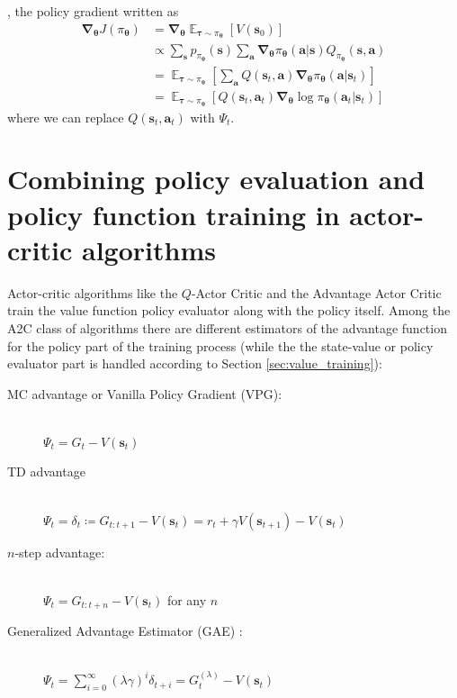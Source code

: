 \documentclass{article}
\begin{document}
\cite{sutton_barto_rl}, the policy gradient written as\begin{equation}\begin{split}\boldsymbol{\nabla}_{\boldsymbol{\theta}}J(\pi_{\boldsymbol{\theta}})&=\boldsymbol{\nabla}_{\boldsymbol{\theta}}\mathop{\mathbb{E}}_{\boldsymbol{\tau}\sim\pi_{\boldsymbol{\theta}}}[V(\mathbf{s}_0)]\\&\propto\sum_\mathbf{s}p_{\pi_{\boldsymbol{\theta}}}(\mathbf{s})\sum_\mathbf{a}\boldsymbol{\nabla}_{\boldsymbol{\theta}}\pi_{\boldsymbol{\theta}}(\mathbf{a}|\mathbf{s})Q_{\pi_{\boldsymbol{\theta}}}(\mathbf{s},\mathbf{a})\\&=\mathop{\mathbb{E}}_{\boldsymbol{\tau}\sim\pi_{\boldsymbol{\theta}}}\left[\sum_\mathbf{a}Q(\mathbf{s}_t, \mathbf{a})\boldsymbol{\nabla}_{\boldsymbol{\theta}}\pi_{\boldsymbol{\theta}}(\mathbf{a}|\mathbf{s}_t)\right]\\&=\mathop{\mathbb{E}}_{\boldsymbol{\tau}\sim\pi_{\boldsymbol{\theta}}}\left[Q(\mathbf{s}_t, \mathbf{a}_t)\boldsymbol{\nabla}_{\boldsymbol{\theta}}\log\pi_{\boldsymbol{\theta}}(\mathbf{a}_t|\mathbf{s}_t)\right]\end{split}\end{equation}where we can replace $Q(\mathbf{s}_t,\mathbf{a}_t)$ with $\Psi_t$.

\section{Combining policy evaluation and policy function training in actor-critic algorithms}
Actor-critic algorithms like the $Q$-Actor Critic and the Advantage Actor Critic train the value function policy evaluator along with the policy itself. Among the A2C class of algorithms there are different estimators of the advantage function for the policy part of the training process (while the the state-value or policy evaluator part is handled according to Section \ref{sec:value_training}):
\begin{description}
\item[MC advantage or Vanilla Policy Gradient (VPG):]\hfill \\
$\Psi_t =G_t-V(\mathbf{s}_t)$
\item[TD advantage]\hfill \\
$\Psi_t =\delta_t\coloneqq G_{t:t+1}-V(\mathbf{s}_t)= r_t+\gamma V(\mathbf{s}_{t+1})-V(\mathbf{s}_t)$
\item[$n$-step advantage:]\hfill \\
$\Psi_t =G_{t:t+n}-V(\mathbf{s}_t)$ for any $n$
\item[Generalized Advantage Estimator (GAE) :]\hfill \\ 
$\Psi_t=\sum_{i=0}^\infty(\lambda\gamma)^i\delta_{t+i}=G^{(\lambda)}_t-V(\mathbf{s}_{t})$
\end{description}
\end{document}

